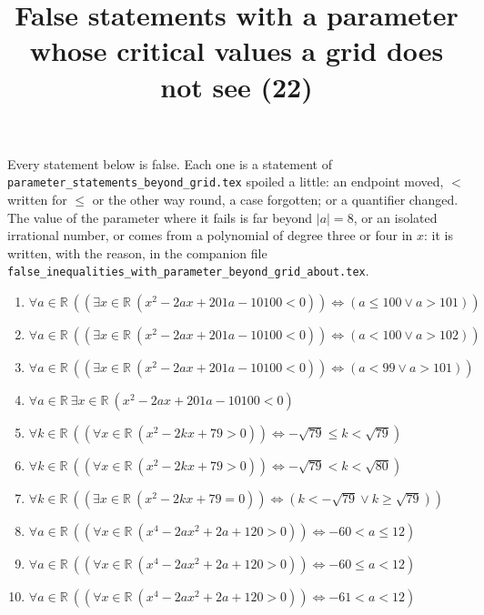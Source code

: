 \documentclass[11pt,a4paper]{article}
\title{False statements with a parameter whose critical values a grid does not see (22)}
\author{}
\date{}
\begin{document}
\maketitle
Every statement below is false. Each one is a statement of \texttt{parameter\_statements\_beyond\_grid.tex} spoiled a little: an endpoint moved, $<$ written for $\le$ or the other way round, a case forgotten; or a quantifier changed. The value of the parameter where it fails is far beyond $|a| = 8$, or an isolated irrational number, or comes from a polynomial of degree three or four in $x$: it is written, with the reason, in the companion file \texttt{false\_inequalities\_with\_parameter\_beyond\_grid\_about.tex}.

\begin{enumerate}
\item $\displaystyle \forall a \in \mathbb{R}\ \left( \left( \exists x \in \mathbb{R}\ (x^{2} - 2ax + 201a - 10100 < 0) \right) \iff (a \le 100 \lor a > 101) \right)$
\item $\displaystyle \forall a \in \mathbb{R}\ \left( \left( \exists x \in \mathbb{R}\ (x^{2} - 2ax + 201a - 10100 < 0) \right) \iff (a < 100 \lor a > 102) \right)$
\item $\displaystyle \forall a \in \mathbb{R}\ \left( \left( \exists x \in \mathbb{R}\ (x^{2} - 2ax + 201a - 10100 < 0) \right) \iff (a < 99 \lor a > 101) \right)$
\item $\displaystyle \forall a \in \mathbb{R}\ \exists x \in \mathbb{R}\ (x^{2} - 2ax + 201a - 10100 < 0)$
\item $\displaystyle \forall k \in \mathbb{R}\ \left( \left( \forall x \in \mathbb{R}\ (x^{2} - 2kx + 79 > 0) \right) \iff -\sqrt{79} \le k < \sqrt{79} \right)$
\item $\displaystyle \forall k \in \mathbb{R}\ \left( \left( \forall x \in \mathbb{R}\ (x^{2} - 2kx + 79 > 0) \right) \iff -\sqrt{79} < k < \sqrt{80} \right)$
\item $\displaystyle \forall k \in \mathbb{R}\ \left( \left( \exists x \in \mathbb{R}\ (x^{2} - 2kx + 79 = 0) \right) \iff (k < -\sqrt{79} \lor k \ge \sqrt{79}) \right)$
\item $\displaystyle \forall a \in \mathbb{R}\ \left( \left( \forall x \in \mathbb{R}\ (x^{4} - 2ax^{2} + 2a + 120 > 0) \right) \iff -60 < a \le 12 \right)$
\item $\displaystyle \forall a \in \mathbb{R}\ \left( \left( \forall x \in \mathbb{R}\ (x^{4} - 2ax^{2} + 2a + 120 > 0) \right) \iff -60 \le a < 12 \right)$
\item $\displaystyle \forall a \in \mathbb{R}\ \left( \left( \forall x \in \mathbb{R}\ (x^{4} - 2ax^{2} + 2a + 120 > 0) \right) \iff -61 < a < 12 \right)$

\end{enumerate}
\end{document}
